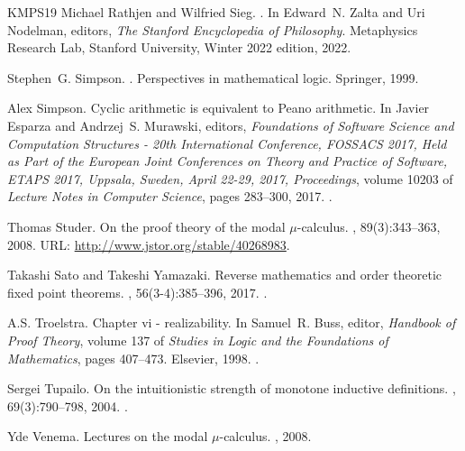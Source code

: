 \documentclass[10pt,a4paper]{amsart}
\theoremstyle{plain}
\theoremstyle{definition}
\theoremstyle{plain}
\theoremstyle{definition} %
\begin{document}
\begin{thebibliography}{KMPS19}
Michael Rathjen and Wilfried Sieg.
.
\newblock In Edward~N. Zalta and Uri Nodelman, editors, {\em The {Stanford} Encyclopedia of Philosophy}. Metaphysics Research Lab, Stanford University, {W}inter 2022 edition, 2022.

Stephen~G. Simpson.
.
\newblock Perspectives in mathematical logic. Springer, 1999.

Alex Simpson.
\newblock Cyclic arithmetic is equivalent to {P}eano arithmetic.
\newblock In Javier Esparza and Andrzej~S. Murawski, editors, {\em Foundations of Software Science and Computation Structures - 20th International Conference, {FOSSACS} 2017, Held as Part of the European Joint Conferences on Theory and Practice of Software, {ETAPS} 2017, Uppsala, Sweden, April 22-29, 2017, Proceedings}, volume 10203 of {\em Lecture Notes in Computer Science}, pages 283--300, 2017.
\newblock \href {https://doi.org/10.1007/978-3-662-54458-7\_17} {}.

Thomas Studer.
\newblock On the proof theory of the modal {$\mu$}-calculus.
, 89(3):343--363, 2008.
\newblock URL: \url{http://www.jstor.org/stable/40268983}.

Takashi Sato and Takeshi Yamazaki.
\newblock Reverse mathematics and order theoretic fixed point theorems.
, 56(3-4):385--396, 2017.
\newblock \href {https://doi.org/10.1007/s00153-017-0526-y} {}.

A.S. Troelstra.
\newblock Chapter vi - realizability.
\newblock In Samuel~R. Buss, editor, {\em Handbook of Proof Theory}, volume 137 of {\em Studies in Logic and the Foundations of Mathematics}, pages 407--473. Elsevier, 1998.
\newblock \href {https://doi.org/10.1016/S0049-237X(98)80021-9} {}.

Sergei Tupailo.
\newblock On the intuitionistic strength of monotone inductive definitions.
, 69(3):790--798, 2004.
\newblock \href {https://doi.org/10.2178/jsl/1096901767} {}.

Yde Venema.
\newblock Lectures on the modal $\mu$-calculus.
, 2008.

\end{thebibliography}
\end{document}
